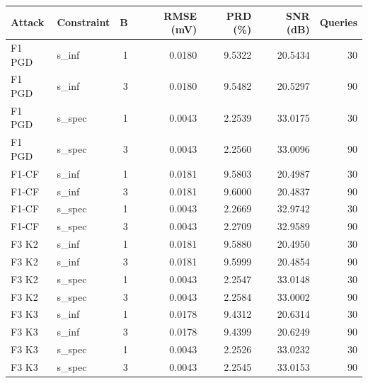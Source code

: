 \begin{tabular}{llrrrrr}
\toprule
Attack & Constraint & B & RMSE (mV) & PRD (\%) & SNR (dB) & Queries \\
\midrule
F1 PGD & s\_inf & 1 & 0.0180 & 9.5322 & 20.5434 & 30 \\
F1 PGD & s\_inf & 3 & 0.0180 & 9.5482 & 20.5297 & 90 \\
F1 PGD & s\_spec & 1 & 0.0043 & 2.2539 & 33.0175 & 30 \\
F1 PGD & s\_spec & 3 & 0.0043 & 2.2560 & 33.0096 & 90 \\
F1-CF & s\_inf & 1 & 0.0181 & 9.5803 & 20.4987 & 30 \\
F1-CF & s\_inf & 3 & 0.0181 & 9.6000 & 20.4837 & 90 \\
F1-CF & s\_spec & 1 & 0.0043 & 2.2669 & 32.9742 & 30 \\
F1-CF & s\_spec & 3 & 0.0043 & 2.2709 & 32.9589 & 90 \\
F3 K2 & s\_inf & 1 & 0.0181 & 9.5880 & 20.4950 & 30 \\
F3 K2 & s\_inf & 3 & 0.0181 & 9.5999 & 20.4854 & 90 \\
F3 K2 & s\_spec & 1 & 0.0043 & 2.2547 & 33.0148 & 30 \\
F3 K2 & s\_spec & 3 & 0.0043 & 2.2584 & 33.0002 & 90 \\
F3 K3 & s\_inf & 1 & 0.0178 & 9.4312 & 20.6314 & 30 \\
F3 K3 & s\_inf & 3 & 0.0178 & 9.4399 & 20.6249 & 90 \\
F3 K3 & s\_spec & 1 & 0.0043 & 2.2526 & 33.0232 & 30 \\
F3 K3 & s\_spec & 3 & 0.0043 & 2.2545 & 33.0153 & 90 \\
\bottomrule
\end{tabular}
